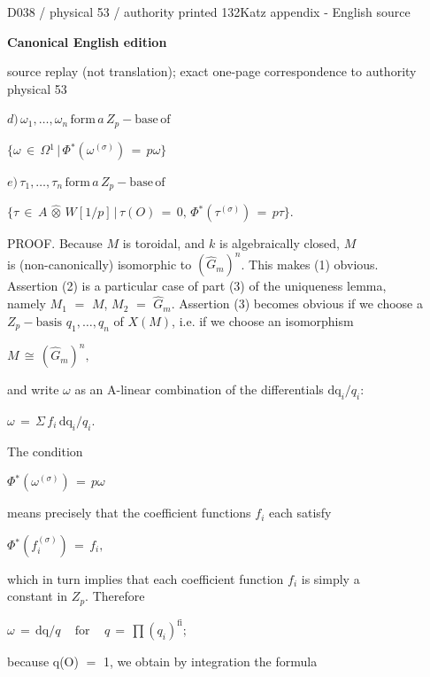 \documentclass[9pt]{article}
\newcommand{\CanonText}[1]{\par{\fontsize{8.0}{9.35}\selectfont\RaggedRight #1\par}\vspace{2.2pt}}
\newcommand{\CanonDisplay}[1]{\par\vspace{1.2pt}\begin{center}{\fontsize{7.2}{8.4}\selectfont\(\displaystyle #1\)}\end{center}\vspace{1.2pt}}
\newcommand{\LayerTitle}{Canonical English edition}
\begin{document}
\noindent\begin{minipage}[t][\dimexpr\textheight-5pt\relax][t]{\textwidth}
{\sffamily\fontsize{7.3}{8.2}\selectfont\color{Quiet} D038 / physical 53 / authority printed 132\hfill Katz appendix - English source}
\par{}\vspace{4.5pt}
{\sffamily\fontsize{10.4}{11.6}\selectfont\bfseries\color{Accent} \LayerTitle}
\par{\sffamily\fontsize{6.7}{7.7}\selectfont\color{Quiet} source replay (not translation); exact one-page correspondence to authority physical 53}
\vspace{5pt}
\CanonDisplay{d)\,\omega{}_{1},\ldots{},\omega{}_{n}\,\text{form}\,a\,Z_{p}-\text{base}\,\text{of}}
\CanonDisplay{\lbrace{}\omega{}\,\in{}\,\Omega{}^{1}\,|\,\Phi{}^{*}(\omega{}^{(\sigma{})})\,=\,p\omega{}\rbrace{}}
\CanonDisplay{e)\,\tau{}_{1},\ldots{},\tau{}_{n}\,\text{form}\,a\,Z_{p}-\text{base}\,\text{of}}
\CanonDisplay{\lbrace{}\tau{}\,\in{}\,A\,\widehat{\otimes}\,W[1/p]\,|\,\tau{}(O)\,=\,0,\,\Phi{}^{*}(\tau{}^{(\sigma{})})\,=\,p\tau{}\rbrace{}.}
\CanonText{PROOF. Because \(M\) is toroidal, and \(k\) is algebraically closed, \(M\)\\is (non-canonically) isomorphic to \((\widehat{G}_{m})^{n}\). This makes (1) obvious.\\Assertion (2) is a particular case of part (3) of the uniqueness lemma,\\namely \(M_{1}\) \(=\) \(M\), \(M_{2}\) \(=\) \(\widehat{G}_{m}\). Assertion (3) becomes obvious if we choose a\\\(Z_{p}-\text{basis}\) \(q_{1},\ldots{},q_{n}\) of \(X(M)\), i.e. if we choose an isomorphism}
\CanonDisplay{M\,\cong{}\,(\widehat{G}_{m})^{n},}
\CanonText{and write \(\omega{}\) as an A-linear combination of the differentials \(\text{dq}_{i}/q_{i}\):}
\CanonDisplay{\omega{}\,=\,\Sigma{}\,f_{i}\,\text{dq}_{i}/q_{i}.}
\CanonText{The condition}
\CanonDisplay{\Phi{}^{*}(\omega{}^{(\sigma{})})\,=\,p\omega{}}
\CanonText{means precisely that the coefficient functions \(f_{i}\) each satisfy}
\CanonDisplay{\Phi{}^{*}(f_{i}^{(\sigma{})})\,=\,f_{i},}
\CanonText{which in turn implies that each coefficient function \(f_{i}\) is simply a\\constant in \(Z_{p}\). Therefore}
\CanonDisplay{\omega{}\,=\,\text{dq}/q\quad\,\text{for}\quad\,q\,=\,\prod{}(q_{i})^{\mathrm{fi}};}
\CanonText{because q(O) \(=\) 1, we obtain by integration the formula}

\end{minipage}
\end{document}
